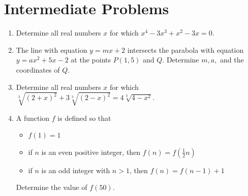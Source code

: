 \documentclass[12pt]{article}
\begin{document}
\section*{Intermediate Problems}
\begin{enumerate}
    \item Determine all real numbers $x$ for which $x^4 - 3x^3 + x^2 - 3x = 0$. \interspace
    \item The line with equation $y = mx + 2$ intersects the parabola with equation $y = ax^2 + 5x - 2$ at the points $P(1, 5)$ and $Q$. Determine $m, a,$ and the coordinates of $Q$. \interspace
    \item Determine all real numbers $x$ for which $\sqrt[3]{(2 + x)^2} + 3\sqrt[3]{(2 - x)^2} = 4\sqrt[3]{4-x^2}$. \interspace
    \item A function $f$ is defined so that
    \begin{itemize}
        \item $f(1) = 1$
        \item if $n$ is an even positive integer, then $f(n) = f(\frac{1}{2}n)$
        \item if $n$ is an odd integer with $n > 1$, then $f(n) = f(n - 1) + 1$
    \end{itemize} Determine the value of $f(50)$. \interspace
\end{enumerate} \newpage
\end{document}
